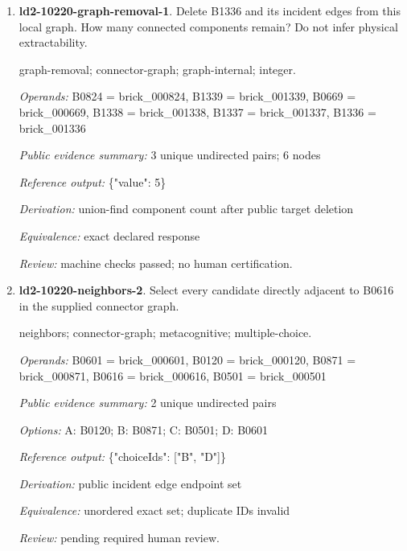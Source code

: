 \begin{enumerate}
\par{\small neighbors; connector-graph; metacognitive; multiple-choice.\par\textit{Operands:} B1338 = brick\_001338, B1337 = brick\_001337, B0669 = brick\_000669, B0824 = brick\_000824, B1339 = brick\_001339, B1336 = brick\_001336\par\textit{Public evidence summary:} 3 unique undirected pairs\par\textit{Options:} A: B1337; B: B0669; C: B0824; D: B1338; E: B1339\par\textit{Reference output:} \{"choiceIds": ["A", "D", "E"]\}\par\textit{Derivation:} public incident edge endpoint set\par\textit{Equivalence:} unordered exact set; duplicate IDs invalid\par\textit{Review:} machine checks passed; no human certification.}
\item \textbf{ld2-10220-graph-removal-1}. Delete B1336 and its incident edges from this local graph. How many connected components remain? Do not infer physical extractability.
\par{\small graph-removal; connector-graph; graph-internal; integer.\par\textit{Operands:} B0824 = brick\_000824, B1339 = brick\_001339, B0669 = brick\_000669, B1338 = brick\_001338, B1337 = brick\_001337, B1336 = brick\_001336\par\textit{Public evidence summary:} 3 unique undirected pairs; 6 nodes\par\textit{Reference output:} \{"value": 5\}\par\textit{Derivation:} union-find component count after public target deletion\par\textit{Equivalence:} exact declared response\par\textit{Review:} machine checks passed; no human certification.}
\item \textbf{ld2-10220-neighbors-2}. Select every candidate directly adjacent to B0616 in the supplied connector graph.
\par{\small neighbors; connector-graph; metacognitive; multiple-choice.\par\textit{Operands:} B0601 = brick\_000601, B0120 = brick\_000120, B0871 = brick\_000871, B0616 = brick\_000616, B0501 = brick\_000501\par\textit{Public evidence summary:} 2 unique undirected pairs\par\textit{Options:} A: B0120; B: B0871; C: B0501; D: B0601\par\textit{Reference output:} \{"choiceIds": ["B", "D"]\}\par\textit{Derivation:} public incident edge endpoint set\par\textit{Equivalence:} unordered exact set; duplicate IDs invalid\par\textit{Review:} pending required human review.}

\end{enumerate}
